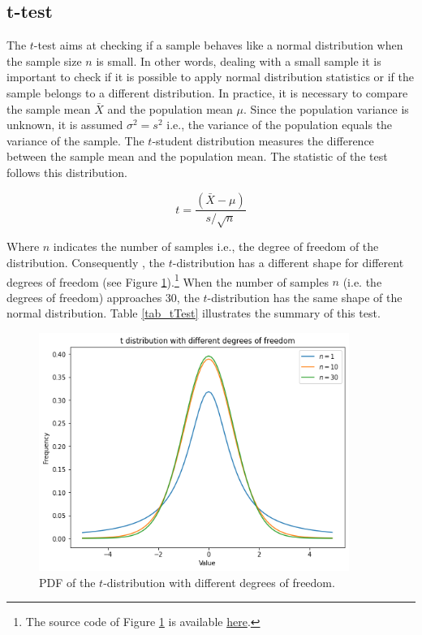 \subsection{t-test}
The $t$-test aims at checking if a sample behaves like a normal distribution when the sample size $n$ is small. In other words, dealing with a small sample it is important to check if it is possible to apply normal distribution statistics or if the sample belongs to a different distribution. In practice, it is necessary to compare the sample mean $\bar{X}$ and the population mean $\mu$. Since the population variance is unknown, it is assumed $\sigma^2=s^2$ i.e., the variance of the population equals the variance of the sample. The $t$-student distribution measures the difference between the sample mean and the population mean. The statistic of the test follows this distribution.

\begin{equation}
t=\frac{(\bar{X}-\mu)}{s/\sqrt n}
\label{eq_tTest}
\end{equation}

Where $n$ indicates the number of samples i.e., the degree of freedom of the distribution. Consequently , the $t$-distribution has a different shape for different degrees of freedom (see Figure \ref{fig_tDist}).\footnote{The source code of Figure \ref{fig_tDist} is available \href{https://github.com/aletuf93/logproj/blob/master/examples/03.\%20Statistics.ipynb}{here}.} When the number of samples $n$ (i.e. the degrees of freedom) approaches $30$, the $t$-distribution has the same shape of the normal distribution. Table \ref{tab_tTest} illustrates the summary of this test.

\begin{figure}[hbt!]
\centering
\includegraphics[width=0.9\textwidth]{SectionLetsMath/elemStat_figures/fig_tDist.png}
\captionsetup{type=figure}
\caption{PDF of the $t$-distribution with different degrees of freedom.}
\label{fig_tDist}
\end{figure}

